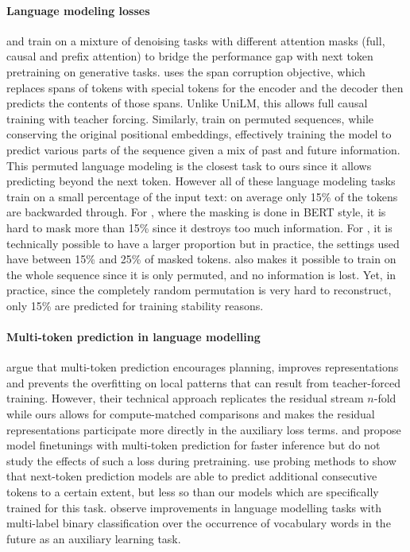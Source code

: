 

\paragraph{Language modeling losses}

\citet{dong2019unified} and \citet{tay2022ul2} train on a mixture of denoising tasks with different attention masks (full, causal and prefix attention) to bridge the performance gap with next token pretraining on generative tasks. \citet{tay2022ul2} uses the span corruption objective, which replaces spans of tokens with special tokens for the encoder and the decoder then predicts the contents of those spans. Unlike UniLM, this allows full causal training with teacher forcing. Similarly, \citet{yang2019xlnet} train on permuted sequences, while conserving the original positional embeddings, effectively training the model to predict various parts of the sequence given a mix of past and future information. This permuted language modeling is the closest task to ours since it allows predicting beyond the next token. However all of these language modeling tasks train on a small percentage of the input text: on average only 15\% of the tokens are backwarded through. For \citet{dong2019unified}, where the masking is done in BERT style, it is hard to mask more than 15\% since it destroys too much information. For \citet{tay2022ul2}, it is technically possible to have a larger proportion but in practice, the settings used have between 15\% and 25\% of masked tokens. \cite{yang2019xlnet} also makes it possible to train on the whole sequence since it is only permuted, and no information is lost. Yet, in practice, since the completely random permutation is very hard to reconstruct, only 15\% are predicted for training stability reasons. 

\paragraph{Multi-token prediction in language modelling}
\citet{qi2020prophetnet} argue that multi-token prediction encourages planning, improves representations and prevents the overfitting on local patterns that can result from teacher-forced training. However, their technical approach replicates the residual stream $n$-fold while ours allows for compute-matched comparisons and makes the residual representations participate more directly in the auxiliary loss terms. \citet{stern2018blockwise} and \citet{cai2024medusa} propose model finetunings with multi-token prediction for faster inference but do not study the effects of such a loss during pretraining. \citet{pal2023future} use probing methods to show that next-token prediction models are able to predict additional consecutive tokens to a certain extent, but less so than our models which are specifically trained for this task.
\citet{jianyu_leon} observe improvements in language modelling tasks with multi-label binary classification over the occurrence of vocabulary words in the future as an auxiliary learning task.

